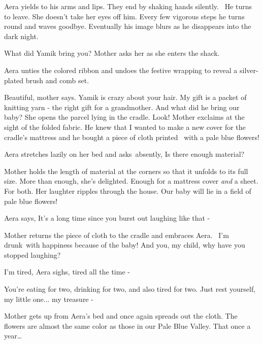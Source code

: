 \documentclass[letterpaper]{article}
\begin{document}
Aera yields to his arms and lips. They end by shaking hands silently. ~He turns to leave. She doesn't take her eyes off
him. Every few vigorous steps he turns round and waves goodbye. Eventually his image blurs as he disappears into the
dark night. 

{\textquotedbl}What did Yamik bring you?{\textquotedbl} Mother asks her as she enters the shack. 

Aera unties the colored ribbon and undoes the festive wrapping to reveal a silver-plated brush and comb set.

{\textquotedbl}Beautiful,{\textquotedbl} mother says. {\textquotedbl}Yamik is crazy about your hair. My gift is a packet
of knitting yarn - the right gift for a grandmother. And what did he bring our baby?{\textquotedbl} She opens the
parcel lying in the cradle. {\textquotedbl}Look!{\textquotedbl} Mother exclaims at the sight of the folded fabric.
{\textquotedbl}He knew that I wanted to make a new cover for the cradle's mattress and he bought a piece of cloth
printed \ with a pale blue flowers!{\textquotedbl} 

Aera stretches lazily on her bed and asks~absently, {\textquotedbl}Is there enough material?{\textquotedbl}

Mother holds the length of material at the corners so that it unfolds to its full size. {\textquotedbl}More than
enough,{\textquotedbl} she's delighted. {\textquotedbl}Enough for a mattress cover \textit{and} a sheet. For
both.{\textquotedbl} Her laughter ripples through the house. {\textquotedbl}Our baby will lie in a field of pale blue
flowers!{\textquotedbl} 

Aera says, {\textquotedbl}It's a long time since you burst out laughing like that -{\textquotedbl} 

Mother returns the piece of cloth to the cradle and embraces Aera. ~{\textquotedbl}I'm drunk~with happiness because of
the baby! And you, my child, why have you stopped laughing?{\textquotedbl} 

{\textquotedbl}I'm tired,{\textquotedbl} Aera sighs, {\textquotedbl}tired all the time -{\textquotedbl} 

{\textquotedbl}You're eating for two, drinking for two, and also tired for two. Just rest yourself, my little one... my
treasure -{\textquotedbl}~ 

Mother gets up from Aera's bed and once again spreads out the cloth. {\textquotedbl}The flowers are almost the same
color as those in our Pale Blue Valley. That once a year{\dots}{\textquotedbl} 
\end{document}
